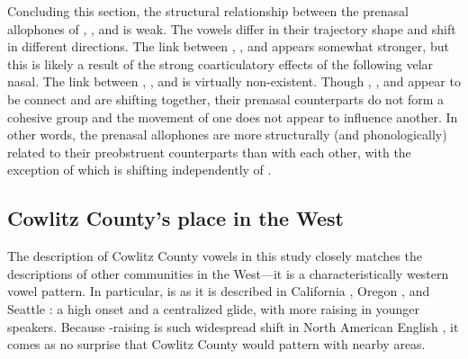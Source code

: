 Concluding this section, the structural relationship between the prenasal allophones of \trap, \dress, and \kit is weak. The vowels differ in their trajectory shape and shift in different directions. The link between \bing, \beng, and \bang appears somewhat stronger, but this is likely a result of the strong coarticulatory effects of the following velar nasal. The link between \bin, \ben, and \ban is virtually non-existent. Though \bit, \bet, and \bat appear to be connect and are shifting together, their prenasal counterparts do not form a cohesive group and the movement of one does not appear to influence another. In other words, the prenasal allophones are more structurally (and phonologically) related to their preobstruent counterparts than with each other, with the exception of \ban which is shifting independently of \bat.

\subsection{Cowlitz County's place in the West}
\label{sec:cowlitz_place_in_west_prenasal}

The description of Cowlitz County vowels in this study closely matches the descriptions of other communities in the West---it is a characteristically western vowel pattern. In particular, \ban is as it is described in California \citep{eckert_2008, cardoso_etal_2016_pads}, Oregon \citep{becker_etal_2016_pads}, and Seattle \citep{swan_2016_diss}: a high onset and a centralized glide, with more raising in younger speakers. Because \ban-raising is such widespread shift in North American English \citep{thomas_2001}, it comes as no surprise that Cowlitz County would pattern with nearby areas.

